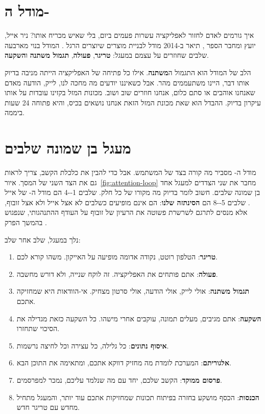 \section{מודל ה-\texorpdfstring{}{Hook}}

איך גורמים לאדם לחזור לאפליקציה עשרות פעמים ביום, בלי שאיש מכריח אותו? ניר אייל, יועץ ומחבר הספר , תיאר ב-2014 מודל לבניית מוצרים שיוצרים הרגל \parencite{eyal2014}. המודל בנוי מארבעה שלבים שחוזרים על עצמם במעגל: \textbf{טריגר}, \textbf{פעולה}, \textbf{תגמול משתנה} ו\textbf{השקעה}.

הלב של המודל הוא התגמול ה\textbf{משתנה}. אילו כל פתיחה של האפליקציה הייתה מניבה בדיוק אותו דבר, היינו משתעממים מהר. אבל כשאיננו יודעים מה מחכה לנו, לייק, הודעה מאדם שאנחנו אוהבים או סתם כלום, אנחנו חוזרים שוב ושוב. מכונות המזל בקזינו עובדות על אותו עיקרון בדיוק. ההבדל הוא שאת מכונת המזל הזאת אנחנו נושאים בכיס, והיא פתוחה 24 שעות ביממה.

\section{מעגל בן שמונה שלבים}

מודל ה- מסביר מה קורה בצד של המשתמש. אבל כדי להבין את כלכלת הקשב, צריך לראות גם את הצד השני של המסך. איור~\ref{fig:attention-loop} מחבר את שני הצדדים למעגל אחד בן שמונה שלבים. חשוב לומר בדיוק מה מקורו של כל חלק. שלבים \num{1--4} הם מודל ה- של אייל \parencite{eyal2014}. שלבים \num{5--8} הם \textbf{הסינתזה שלנו}: הם אינם מופיעים כשלבים לא אצל אייל ולא אצל זובוף, אלא מנסים לתרגם לשרשרת פשוטה את הרעיון של זובוף על העודף ההתנהגותי, שנפגוש בהמשך הפרק \parencite{zuboff2019}.



נלך במעגל, שלב אחר שלב:

\begin{enumerate}
  \item \textbf{טריגר}: הטלפון רוטט, נקודה אדומה מופיעה על האייקון. משהו קורא לכם.
  \item \textbf{פעולה}: אתם פותחים את האפליקציה. זה לוקח שנייה, ולא דורש מחשבה.
  \item \textbf{תגמול משתנה}: אולי לייק, אולי הודעה, אולי סרטון מצחיק. אי-הוודאות היא שמחזיקה אתכם.
  \item \textbf{השקעה}: אתם מגיבים, מעלים תמונה, עוקבים אחרי מישהו. כל השקעה כזאת מגדילה את הסיכוי שתחזרו.
  \item \textbf{איסוף נתונים}: כל גלילה, כל עצירה וכל לחיצה נרשמות.
  \item \textbf{אלגוריתם}: המערכת לומדת מה מחזיק דווקא אתכם, ומתאימה את התוכן הבא.
  \item \textbf{פרסום ממוקד}: הקשב שלכם, יחד עם מה שנלמד עליכם, נמכר למפרסמים.
  \item \textbf{הכנסות}: הכסף מושקע בחזרה בפיתוח תכונות שמחזיקות אתכם עוד יותר, והמעגל מתחיל מחדש עם טריגר חדש.
\end{enumerate}

